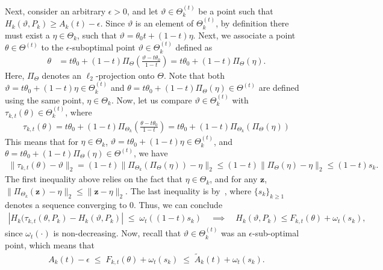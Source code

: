 \documentclass{article}
\theoremstyle{plain}
\theoremstyle{definition}
\newcommand{\lrp}[1]{\left( #1 \right)}
\newcommand{\zvec}{\mathbf{z}}
\begin{document}
Next, consider an arbitrary $\epsilon>0$, and let $\vartheta \in \Theta_k^{(t)}$ be a point such that $H_k(\vartheta, P_k) \geq A_k(t) - \epsilon$.  Since $\vartheta$ is an element of $\Theta_k^{(t)}$, by definition there must exist a $\eta \in \Theta_k$, such that $\vartheta = \theta_0 t + (1-t) \eta$. Next, we associate a point $\theta \in \Theta^{(t)}$ to the $\epsilon$-suboptimal point $\vartheta \in \Theta^{(t)}_k$ defined as 
\begin{align}
    \theta &= t \theta_0 + (1-t) \Pi_\Theta \lrp{\frac{\vartheta - t\theta_0}{1-t}} = t \theta_0 + (1-t) \Pi_\Theta(\eta). 
\end{align}
Here, $\Pi_{\Theta}$ denotes an $\ell_2$-projection  onto $\Theta$. 
Note that both $\vartheta = t\theta_0 + (1-t)\eta \in \Theta_k^{(t)}$ and $\theta = t \theta_0 + (1-t) \Pi_{\Theta}(\eta) \in \Theta^{(t)}$ are defined using the same point, $\eta \in \Theta_k$. Now, let us compare $\vartheta \in \Theta^{(t)}_k$ with $\tau_{k,t}(\theta) \in \Theta^{(t)}_k$, where 
\begin{align}
    \tau_{k,t}(\theta) = t \theta_0 + (1-t) \Pi_{\Theta_k}\lrp{\frac{\theta - t \theta_0}{1-t}} = t \theta_0 + (1-t) \Pi_{\Theta_k}\lrp{\Pi_\Theta(\eta)}
\end{align}
This means that for $\eta \in \Theta_k$, $\vartheta = t\theta_0 + (1-t)\eta \in \Theta^{(t)}_k$, and $\theta = t \theta_0 + (1-t) \Pi_{\Theta}(\eta) \in \Theta^{(t)}$,  we have 
\begin{align}
    \|\tau_{k,t}(\theta) - \vartheta\|_2   = (1-t) \|\Pi_{\Theta_k}(\Pi_{\Theta}(\eta)) - \eta\|_2 \leq (1-t)\|\Pi_{\Theta}(\eta) - \eta\|_2 \leq (1-t) s_k. 
\end{align}
The first inequality above relies on the fact that $\eta \in \Theta_k$, and for any $\zvec$, $\|\Pi_{\Theta_k}(\zvec) - \eta\|_2 \leq \|\zvec - \eta\|_2$. The last inequality is by~, where $\{s_k\}_{k \geq 1}$ denotes a sequence converging to $0$. Thus, we can conclude
\begin{align}
    |H_k(\tau_{k,t}(\theta, P_k) - H_k(\vartheta, P_k)| \;\leq\; \omega_t\lrp{(1-t) s_k} \quad \implies \quad H_k(\vartheta, P_k) \leq  F_{k,t}(\theta) + \omega_t\lrp{s_k}, 
\end{align}
since $\omega_t(\cdot)$ is non-decreasing. 
Now, recall that $\vartheta \in \Theta_k^{(t)}$ was an $\epsilon$-sub-optimal point, which means that 
\begin{align}
    A_k(t) - \epsilon \;\leq\; F_{k,t}(\theta) + \omega_t(s_k) \;\leq \;  \widetilde{A}_k(t) + \omega_t(s_k). \label{eq:approx-constaint-proof-4}
\end{align}
\end{document}
